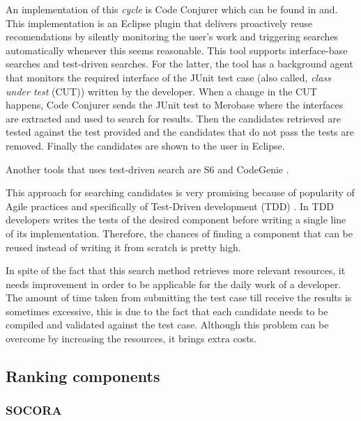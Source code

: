 An implementation of this \textit{cycle} is Code Conjurer which can be found in \citep{Hummel2008} and\citep{Hummel2013}. This implementation is an Eclipse plugin that delivers proactively reuse recomendations by silently monitoring the user's work and triggering searches automatically whenever this seems reasonable. This tool supports interface-base searches and test-driven searches. For the latter, the tool has a background agent that monitors the required interface of the JUnit test case (also called, \textit{class under test} (CUT)) written by the developer. When a change in the CUT happens, Code Conjurer sends the JUnit test to Merobase where the interfaces are extracted and used to search for results. Then the candidates retrieved are tested against the test provided and the candidates that do not pass the tests are removed. Finally the candidates are shown to the user in Eclipse.

Another tools that uses test-driven search are S6 \citep{Reiss2009} and CodeGenie \citep{Lemos2007}.

This approach for searching candidates is very promising because of popularity of Agile practices and specifically of Test-Driven development (TDD) \citep{Beck2003}. In TDD developers writes the tests of the desired component before writing a single line of its implementation. Therefore, the chances of finding a component that can be reused instead of writing it from scratch is pretty high.

In spite of the fact that this search method retrieves more relevant resources, it needs improvement in order to be applicable for the daily work of a developer. The amount of time taken from submitting the test case till receive the results is sometimes excessive, this is due to the fact that each candidate needs to be compiled and validated against the test case. Although this problem can be overcome by increasing the resources, it brings extra costs. 

\subsection{Ranking components}
\subsubsection{SOCORA}

